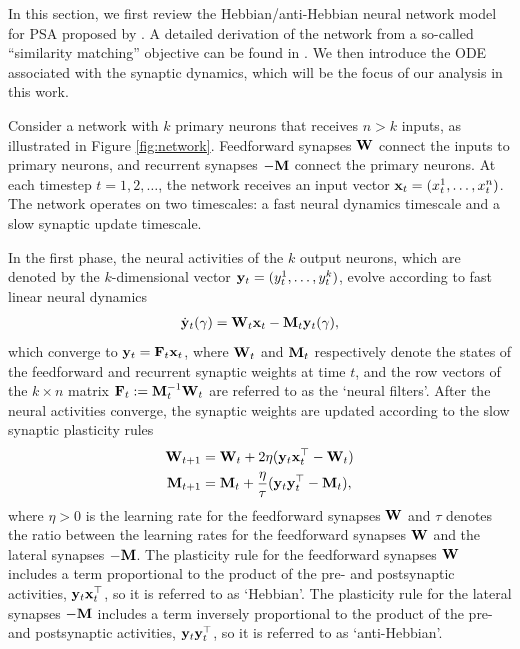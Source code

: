 \documentclass[11pt]{article}
\theoremstyle{definition}
\newcommand{\x}{{\bf x}}
\newcommand{\y}{{\bf y}}
\newcommand{\F}{{\bf F}}
\newcommand{\M}{{\bf M}}
\newcommand{\W}{{\bf W}}
\begin{document}
In this section, we first review the Hebbian/anti-Hebbian neural network model for PSA proposed by \citet{pehlevan2015hebbian}.
A detailed derivation of the network from a so-called ``similarity matching'' objective can be found in \citep{pehlevan2015hebbian,pehlevan2018similarity}.
We then introduce the ODE associated with the synaptic dynamics, which will be the focus of our analysis in this work.

Consider a network with $k$ primary neurons that receives $n>k$ inputs, as illustrated in Figure \ref{fig:network}. 
Feedforward synapses $\W$ connect the inputs to primary neurons, and recurrent synapses $-\M$ connect the primary neurons. 
At each timestep $t=1,2,\dots$, the network receives an input vector $\x_t=(x_t^1,\dots,x_t^n)$.
The network operates on two timescales: a fast neural dynamics timescale and a slow synaptic update timescale.

In the first phase, the neural activities of the $k$ output neurons, which are denoted by the $k$-dimensional vector $\y_t=(y_t^1,\dots,y_t^k)$, evolve according to fast linear neural dynamics
\begin{align*}
    \dot\y_t(\gamma)=\W_t\x_t-\M_t\y_t(\gamma),
\end{align*}
which converge to $\y_t=\F_t\x_t$, where $\W_t$ and $\M_t$ respectively denote the states of the feedforward and recurrent synaptic weights at time $t$, and the row vectors of the $k\times n$ matrix $\F_t:=\M_t^{-1}\W_t$ are referred to as the `neural filters'. After the neural activities converge, the synaptic weights are updated according to the slow synaptic plasticity rules
\begin{align}
    \W_{t+1}&=\W_t+2\eta(\y_t\x_t^\top-\W_t) \label{eq:DW}\\ 
    \M_{t+1}&=\M_t+\frac\eta\tau(\y_t\y_t^\top-\M_t)\label{eq:DM},
\end{align}
where $\eta>0$ is the learning rate for the feedforward synapses $\W$ and $\tau$ denotes the ratio between the learning rates for the feedforward synapses $\W$ and the lateral synapses $-\M$. The plasticity rule for the feedforward synapses $\W$ includes a term proportional to the product of the pre- and postsynaptic activities, $\y_t\x_t^\top$, so it is referred to as `Hebbian'. The plasticity rule for the lateral synapses $-\M$ includes a term inversely proportional to the product of the pre- and postsynaptic activities, $\y_t\y_t^\top$, so it is referred to as `anti-Hebbian'.
\end{document}
